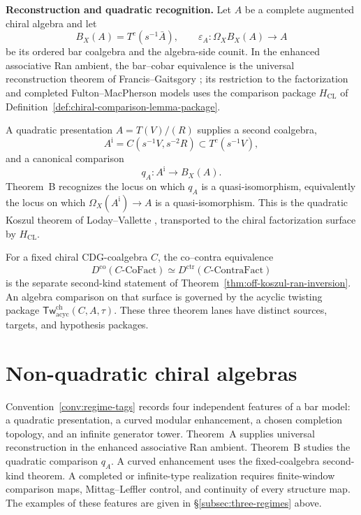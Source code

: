 \providecommand{\Kosz}{\mathsf{Kosz}}
\providecommand{\co}{\mathrm{co}}

\bigskip
\noindent\textbf{Reconstruction and quadratic recognition.}\enspace
Let \(A\) be a complete augmented chiral algebra and let
\[
B_X(A)=T^c(s^{-1}\bar A),\qquad
\varepsilon_A\colon\Omega_X B_X(A)\longrightarrow A
\]
be its ordered bar coalgebra and the algebra-side counit.  In the
enhanced associative Ran ambient, the bar--cobar equivalence is the
universal reconstruction theorem of Francis--Gaitsgory
\cite[Proposition~4.1.2 and the proof of Theorem~5.1.1]{Francis2012};
its restriction to the factorization and completed
Fulton--MacPherson models uses the comparison package
\(H_{\mathrm{CL}}\) of
Definition~\ref{def:chiral-comparison-lemma-package}.

A quadratic presentation \(A=T(V)/(R)\) supplies a second coalgebra,
\[
A^{\mathrm i}=C(s^{-1}V,s^{-2}R)\subset T^c(s^{-1}V),
\]
and a canonical comparison
\[
q_A\colon A^{\mathrm i}\longrightarrow B_X(A).
\]
Theorem~B recognizes the locus on which \(q_A\) is a
quasi-isomorphism, equivalently the locus on which
\(\Omega_X(A^{\mathrm i})\to A\) is a quasi-isomorphism.  This is the
quadratic Koszul theorem of Loday--Vallette
\cite[Theorems~2.3.2 and~3.4.6]{LV12}, transported to the chiral
factorization surface by \(H_{\mathrm{CL}}\).

For a fixed chiral CDG-coalgebra \(C\), the co--contra equivalence
\[
D^{\mathrm{co}}(C\text{-}\mathrm{CoFact})
\simeq
D^{\mathrm{ctr}}(C\text{-}\mathrm{ContraFact})
\]
is the separate second-kind statement of
Theorem~\ref{thm:off-koszul-ran-inversion}.  An algebra comparison on
that surface is governed by the acyclic twisting package
\(\mathsf{Tw}^{\mathrm{ch}}_{\mathrm{acyc}}(C,A,\tau)\).
These three theorem lanes have distinct sources, targets, and
hypothesis packages.

\section{Non-quadratic chiral algebras}
\label{sec:filtered-vs-curved-comprehensive}

\label{sec:bar-convergence-overview}%
Convention~\ref{conv:regime-tags} records four independent features of
a bar model: a quadratic presentation, a curved modular enhancement, a
chosen completion topology, and an infinite generator tower.  Theorem~A
supplies universal reconstruction in the enhanced associative Ran
ambient.  Theorem~B studies the quadratic comparison $q_A$.  A curved
enhancement uses the fixed-coalgebra second-kind theorem.  A completed
or infinite-type realization requires finite-window comparison maps,
Mittag--Leffler control, and continuity of every structure map.  The
examples of these features are given in
\S\ref{subsec:three-regimes} above.

